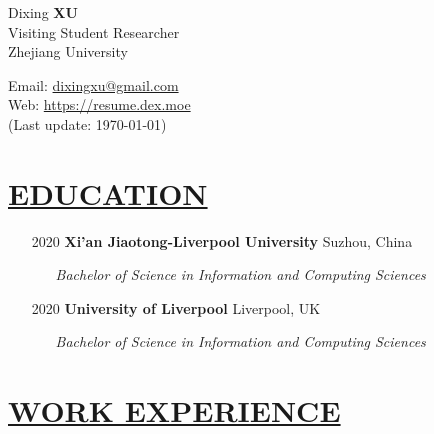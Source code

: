 \documentclass[11pt]{article}
\begin{document}
\begin{minipage}[t]{0.65\textwidth}
    {\Huge Dixing \bf{XU}} \\
    Visiting Student Researcher \\
    Zhejiang University\\
\end{minipage}
\begin{minipage}[t]{0.45\textwidth}
    {\small\raggedright
    Email: \href{mailto:dixingxu@gmail.com}{dixingxu@gmail.com} \\
    Web: \href{https://resume.dex.moe}{https://resume.dex.moe} \\
    (Last update: \today)
    }
\end{minipage}


\section*{\centering\underline{EDUCATION}}
\begin{itemize}[noitemsep, nolistsep]
    \item[2020] \large\textbf{Xi'an Jiaotong-Liverpool University} \hfill Suzhou, China
        \begin{itemize}
            \item[] \textit{Bachelor of Science in Information and Computing Sciences}
        \end{itemize} 
    \item[2020] \large\textbf{University of Liverpool} \hfill Liverpool, UK
        \begin{itemize}
            \item[] \textit{Bachelor of Science in Information and Computing Sciences}
        \end{itemize} 
\end{itemize}

\section*{\centering\underline{WORK EXPERIENCE}}
\end{document}
